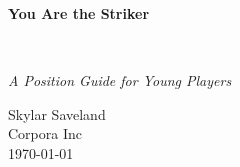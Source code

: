 
\clearpage
\vspace*{1.5in}
\begin{center}
  \begin{minipage}{\textwidth}
    \centering
    \Huge\bfseries
    \linespread{1.25}\selectfont
  You Are the Striker
  \end{minipage}
  \\[3em]
  {\Large\itshape\linespread{1.3}\selectfont
  A Position Guide for Young Players\par}
  \vfill
  {\large Skylar Saveland}
  \\[1em]
  {\large Corpora Inc}
  \\[1em]
  {\large \today}
\end{center}
\clearpage
